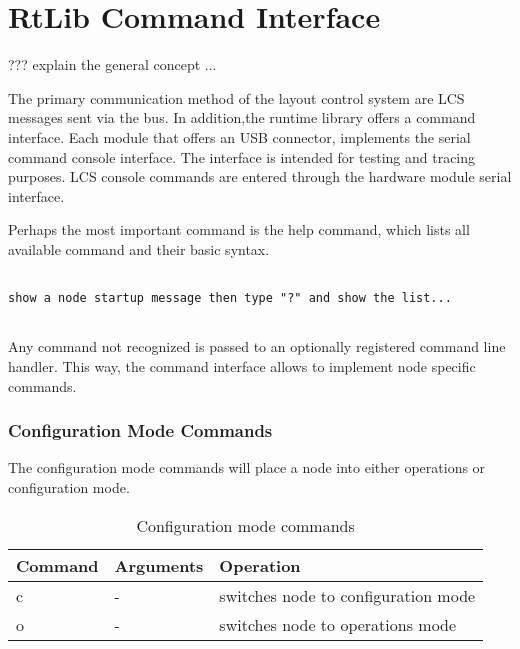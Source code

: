 \chapter{RtLib Command Interface}

???  explain the general concept ...

The primary communication method of the layout control system are LCS messages sent via the bus. In addition,the runtime library offers a command interface. Each module that offers an USB connector, implements the serial command console interface. The interface is intended for testing and tracing purposes. LCS console commands are entered through the hardware module serial interface. 

Perhaps the most important command is the help command, which lists all available command and  their basic syntax.

\lstset{style=codesnippetstyle}
\begin{lstlisting}

show a node startup message then type "?" and show the list...


\end{lstlisting}

Any command not recognized is passed to an optionally registered command line handler. This way, the command interface allows to implement node specific commands.

\subsection{Configuration Mode Commands}

The configuration mode commands will place a node into either operations or configuration mode.

\begin{table}[ht!]
    \begin{center}
        \caption{Configuration mode commands}
        \begin{tabular}{|l|l|p{}|}
            \toprule
            \textbf{Command} & \textbf{Arguments}  & \textbf{Operation} \\
            \midrule
            c & - & switches node to configuration mode\\
            \midrule
            o & - & switches node to operations mode\\
            \bottomrule
        \end{tabular}
    \end{center}
\end{table}
\FloatBarrier


